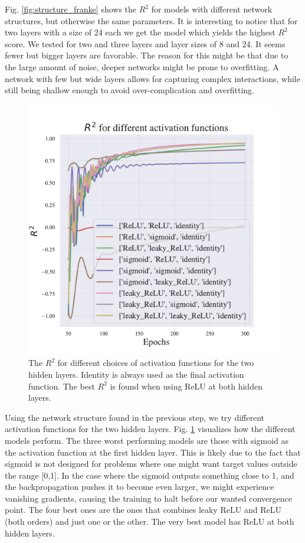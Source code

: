 Fig. \ref{fig:structure_franke} shows the $R^2$ for models with different network structures, but otherwise the same parameters. It is interesting to notice that for two layers with a size of 24 each we get the model which yields the highest $R^2$ score. We tested for two and three layers and layer sizes of 8 and 24. 
It seems fewer but bigger layers are favorable. 
The reason for this might be that due to the large amount of noise, deeper networks might be prone to overfitting.
A network with few but wide layers allows for capturing complex interactions, while still being shallow enough to avoid over-complication and overfitting.

\begin{figure}[h!]
    \centering
    \includegraphics[width=1.0\linewidth]{project_2/figures/$R^2$ for different activation functions_continuous.pdf}
    \caption{The $R^2$ for different choices of activation functions for the two hidden layers. Identity is always used as the final activation function. The best $R^2$ is found when using ReLU at both hidden layers.}
    \label{fig:activation_franke}
\end{figure}

Using the network structure found in the previous step, we try different activation functions for the two hidden layers. 
Fig. \ref{fig:activation_franke} visualizes how the different models perform. 
The three worst performing models are those with sigmoid as the activation function at the first hidden layer. 
This is likely due to the fact that sigmoid is not designed for problems where one might want target values outside the range [0,1].
In the case where the sigmoid outputs something close to 1, and the backpropagation pushes it to become even larger, we might experience vanishing gradients, causing the training to halt before our wanted convergence point.
The four best ones are the ones that combines leaky ReLU and ReLU (both orders) and just one or the other. 
The very best model has ReLU at both hidden layers. 

